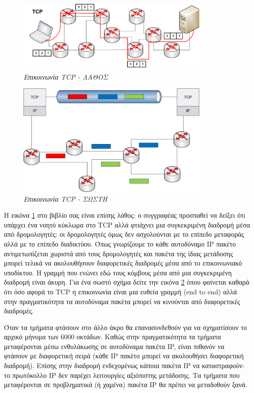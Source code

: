 \begin{figure}[!ht]
 \centering
 \includegraphics[width=0.85\textwidth]{images/chapter4/4-1-w}
 \caption {\textsl{Επικοινωνία TCP - ΛΑΘΟΣ}}
 \label{4-1-w}
\end{figure}

\begin{figure}[!ht]
 \centering
 \includegraphics[width=0.85\textwidth]{images/chapter4/4-1-r}
 \caption {\textsl{Επικοινωνία TCP - ΣΩΣΤΗ}}
 \label{4-1-r}
\end{figure}

Η εικόνα \ref{4-1-w} στο βιβλίο σας είναι επίσης λάθος: ο συγγραφέας προσπαθεί να δείξει ότι υπάρχει ένα νοητό κύκλωμα στο TCP αλλά φτιάχνει μια συγκεκριμένη διαδρομή μέσα από δρομολογητές: οι δρομολογητές όμως δεν ασχολούνται με το επίπεδο μεταφοράς αλλά με το επίπεδο διαδικτύου. Όπως γνωρίζουμε το κάθε αυτοδύναμο IP πακέτο αντιμετωπίζεται χωριστά από τους δρομολογητές και πακέτα της ίδιας μετάδοσης μπορεί τελικά να ακολουθήσουν διαφορετικές διαδρομές μέσα από το επικοινωνιακό υποδίκτυο. Η γραμμή που ενώνει εδώ τους κόμβους μέσα από μια συγκεκριμένη διαδρομή είναι άκυρη. Για ένα σωστό σχήμα δείτε την εικόνα \ref{4-1-r} όπου φαίνεται καθαρά ότι όσο αφορά το TCP η επικοινωνία είναι μια ευθεία γραμμή (end to end) αλλά στην πραγματικότητα τα αυτοδύναμα πακέτα μπορεί να κινούνται από διαφορετικές διαδρομές.

Όταν τα τμήματα φτάσουν στο άλλο άκρο θα επανασυνδεθούν για να σχηματίσουν το αρχικό μήνυμα των 6000 οκτάδων. Καθώς στην πραγματικότητα τα τμήματα μεταφέρονται μέσω ενθυλάκωσης σε αυτοδύναμα πακέτα IP, είναι πιθανόν να φτάσουν με διαφορετική σειρά (κάθε IP πακέτο μπορεί να ακολουθήσει διαφορετική διαδρομή). Επίσης στην διαδρομή ενδεχομένως κάποια πακέτα IP να καταστραφούν: το πρωτόκολλο IP δεν παρέχει λειτουργίες αξιόπιστης μετάδοσης. Τα τμήματα που μεταφέρονται σε προβληματικά (ή χαμένα) πακέτα IP θα πρέπει να μεταδοθούν ξανά.

